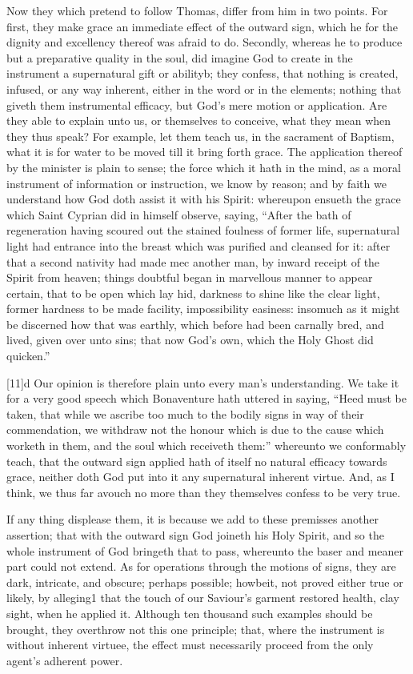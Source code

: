 Now they which pretend to follow Thomas, differ from him in two points. For first, they make grace an immediate effect of the outward sign, which he for the dignity and excellency thereof was afraid to do. Secondly, whereas he to produce but a preparative quality in the soul, did imagine God to create in the instrument a supernatural gift or abilityb; they confess, that nothing is created, infused, or any way inherent, either in the word or in the elements; nothing that giveth them instrumental efficacy, but God’s mere motion or application. Are they able to explain unto us, or themselves  to conceive, what they mean when they thus speak? For example, let them teach us, in the sacrament of Baptism, what it is for water to be moved till it bring forth grace. The application thereof by the minister is plain to sense; the force which it hath in the mind, as a moral instrument of information or instruction, we know by reason; and by faith we understand how God doth assist it with his Spirit: whereupon ensueth the grace which Saint Cyprian did in himself observe, saying, “After the bath of regeneration having scoured out the stained foulness of former life, supernatural light had entrance into the breast which was purified and cleansed for it: after that a second nativity had made mec another man, by inward receipt of the Spirit from heaven; things doubtful began in marvellous manner to appear certain, that to be open which lay hid, darkness to shine like the clear light, former hardness to be made facility, impossibility easiness: insomuch as it might be discerned how that was earthly, which before had been carnally bred, and lived, given over unto sins; that now God’s own, which the Holy Ghost did quicken.”

[11]d Our opinion is therefore plain unto every man’s understanding. We take it for a very good speech which Bonaventure hath uttered in saying, “Heed must be taken, that while we ascribe too much to the bodily signs in way of their commendation, we withdraw not the honour which is due to the cause which worketh in them, and the soul which receiveth them:” whereunto we conformably teach, that the outward sign applied hath of itself no natural efficacy towards grace, neither doth God put into it any supernatural  inherent virtue. And, as I think, we thus far avouch no more than they themselves confess to be very true.

If any thing displease them, it is because we add to these premisses another assertion; that with the outward sign God joineth his Holy Spirit, and so the whole instrument of God bringeth that to pass, whereunto the baser and meaner part could not extend. As for operations through the motions of signs, they are dark, intricate, and obscure; perhaps possible; howbeit, not proved either true or likely, by alleging1 that the touch of our Saviour’s garment restored health, clay sight, when he applied it. Although ten thousand such examples should be brought, they overthrow not this one principle; that, where the instrument is without inherent virtuee, the effect must necessarily proceed from the only agent’s adherent power.

